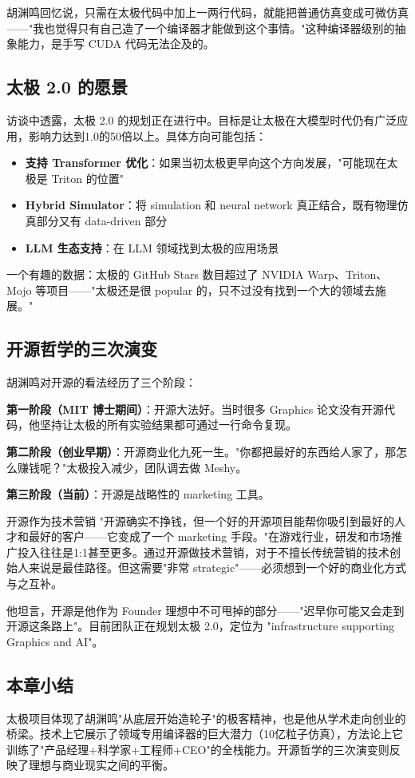 胡渊鸣回忆说，只需在太极代码中加上一两行代码，就能把普通仿真变成可微仿真——"我也觉得只有自己造了一个编译器才能做到这个事情。"这种编译器级别的抽象能力，是手写 CUDA 代码无法企及的。

\subsection{太极 2.0 的愿景}

访谈中透露，太极 2.0 的规划正在进行中。目标是让太极在大模型时代仍有广泛应用，影响力达到1.0的50倍以上。具体方向可能包括：

\begin{itemize}
\item \textbf{支持 Transformer 优化}：如果当初太极更早向这个方向发展，"可能现在太极是 Triton 的位置"
\item \textbf{Hybrid Simulator}：将 simulation 和 neural network 真正结合，既有物理仿真部分又有 data-driven 部分
\item \textbf{LLM 生态支持}：在 LLM 领域找到太极的应用场景
\end{itemize}

一个有趣的数据：太极的 GitHub Stars 数目超过了 NVIDIA Warp、Triton、Mojo 等项目——"太极还是很 popular 的，只不过没有找到一个大的领域去施展。"

\subsection{开源哲学的三次演变}

胡渊鸣对开源的看法经历了三个阶段：

\textbf{第一阶段（MIT 博士期间）}：开源大法好。当时很多 Graphics 论文没有开源代码，他坚持让太极的所有实验结果都可通过一行命令复现。

\textbf{第二阶段（创业早期）}：开源商业化九死一生。"你都把最好的东西给人家了，那怎么赚钱呢？"太极投入减少，团队调去做 Meshy。

\textbf{第三阶段（当前）}：开源是战略性的 marketing 工具。

\begin{importantbox}{开源作为技术营销}
"开源确实不挣钱，但一个好的开源项目能帮你吸引到最好的人才和最好的客户——它变成了一个 marketing 手段。"在游戏行业，研发和市场推广投入往往是1:1甚至更多。通过开源做技术营销，对于不擅长传统营销的技术创始人来说是最佳路径。但这需要"非常 strategic"——必须想到一个好的商业化方式与之互补。
\end{importantbox}

他坦言，开源是他作为 Founder 理想中不可甩掉的部分——"迟早你可能又会走到开源这条路上"。目前团队正在规划太极 2.0，定位为 "infrastructure supporting Graphics and AI"。

\subsection{本章小结}

太极项目体现了胡渊鸣"从底层开始造轮子"的极客精神，也是他从学术走向创业的桥梁。技术上它展示了领域专用编译器的巨大潜力（10亿粒子仿真），方法论上它训练了"产品经理+科学家+工程师+CEO"的全栈能力。开源哲学的三次演变则反映了理想与商业现实之间的平衡。

